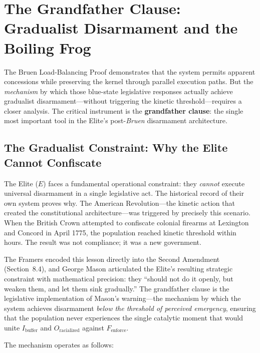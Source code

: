 \documentclass[12pt,openany]{book}
\begin{document}
\section{The Grandfather Clause: Gradualist Disarmament and the Boiling Frog}

The Bruen Load-Balancing Proof demonstrates that the system permits apparent concessions while preserving the kernel through parallel execution paths. But the \textit{mechanism} by which those blue-state legislative responses actually achieve gradualist disarmament---without triggering the kinetic threshold---requires a closer analysis. The critical instrument is the \textbf{grandfather clause}: the single most important tool in the Elite's post-\textit{Bruen} disarmament architecture.

\subsection{The Gradualist Constraint: Why the Elite Cannot Confiscate}

The Elite ($E$) faces a fundamental operational constraint: they \textit{cannot} execute universal disarmament in a single legislative act. The historical record of their own system proves why. The American Revolution---the kinetic action that created the constitutional architecture---was triggered by precisely this scenario. When the British Crown attempted to confiscate colonial firearms at Lexington and Concord in April 1775, the population reached kinetic threshold within hours. The result was not compliance; it was a new government.

The Framers encoded this lesson directly into the Second Amendment (Section~8.4), and George Mason articulated the Elite's resulting strategic constraint with mathematical precision: they ``should not do it openly, but weaken them, and let them sink gradually.'' The grandfather clause is the legislative implementation of Mason's warning---the mechanism by which the system achieves disarmament \textit{below the threshold of perceived emergency}, ensuring that the population never experiences the single catalytic moment that would unite $I_{\text{buffer}}$ and $O_{\text{racialized}}$ against $F_{\text{enforce}}$.

The mechanism operates as follows:
\end{document}
